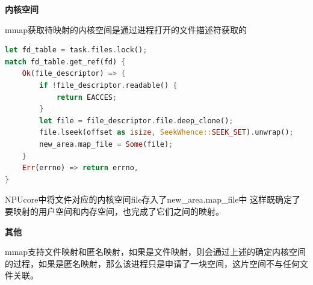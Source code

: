 \textbf{内核空间}

mmap获取待映射的内核空间是通过进程打开的文件描述符获取的
\begin{lstlisting}[language={Rust},
	caption={os/src/mm/memory_set.rs}]
let fd_table = task.files.lock();
match fd_table.get_ref(fd) {
    Ok(file_descriptor) => {
        if !file_descriptor.readable() {
            return EACCES;
        }
        let file = file_descriptor.file.deep_clone();
        file.lseek(offset as isize, SeekWhence::SEEK_SET).unwrap();
        new_area.map_file = Some(file);
    }
    Err(errno) => return errno,
}
\end{lstlisting}
NPUcore中将文件对应的内核空间file存入了new\_area.map\_file中
这样既确定了要映射的用户空间和内存空间，也完成了它们之间的映射。

\textbf{其他}

mmap支持文件映射和匿名映射，如果是文件映射，则会通过上述的确定内核空间的过程，如果是匿名映射，那么该进程只是申请了一块空间，这片空间不与任何文件关联。

